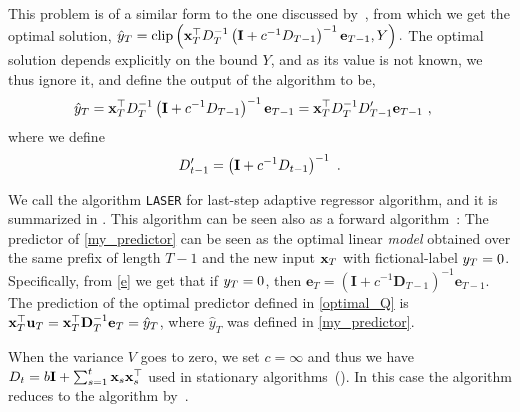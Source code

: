 This problem is of a similar form to the one discussed by~\cite{Forster}, from which we get the optimal solution,
\(
\hat{y}_{T} = {\rm clip}\left({
  {\mathbf{x}}^{\top}_{T}D_{T}^{-1}\left(\mathbf{I}+c^{-1}D_{T-1}\right)^{-1}\mathbf{e}_{T-1},Y}\right).
\)
The optimal solution depends explicitly on the bound $Y$, and as its
value is not known, we thus ignore it, and define the output of
the algorithm to be,
\begin{align}
\hat{y}_{T} &=
{\mathbf{x}}^{\top}_{T}D_{T}^{-1}\left(\mathbf{I}+c^{-1}D_{T-1}\right)^{-1}\mathbf{e}_{T-1}={\mathbf{x}}^{\top}_{T}D_{T}^{-1}D'_{T-1}\mathbf{e}_{T-1}
~, \label{my_predictor}
\end{align}
where we define
\begin{equation}
D'_{t-1}=\left(\mathbf{I}+c^{-1}D_{t-1}\right)^{-1}~.
\label{D_prime}
\end{equation}

We call the algorithm \texttt{LASER} for last-step adaptive regressor
algorithm, and it is summarized in .  This algorithm can be
seen also as a forward algorithm~\citep{AzouryWa01}: The predictor of
\eqref{my_predictor} can be seen as the optimal linear {\em model}
obtained over the same prefix of length $T-1$ and the new
input $\mathbf{x}_{T}$ with fictional-label $y_{T}=0$. Specifically, from \eqref{e}
we get that if $y_{T}=0$, then $\mathbf{e}_{T} = \left(\mathbf{I}+c^{-1}\mathbf{D}_{T-1}\right)^{-1}\mathbf{e}_{T-1}$.
The prediction of the optimal predictor defined in \eqref{optimal_Q} is
${\mathbf{x}}^{\top}_{T}\mathbf{u}_{T}={\mathbf{x}}^{\top}_{T}\mathbf{D}_{T}^{-1}\mathbf{e}_{T}=\hat{y}_T$,
where $\hat{y}_T$
was defined in \eqref{my_predictor}.

When the variance $V$ goes to zero, we set
$c=\infty$ and thus we have $D_{t}=b\mathbf{I}+\sum_{s=1}^t
\mathbf{x}_{s}{\mathbf{x}}^{\top}_{s}$ used in stationary
algorithms~(\citep{Vovk01,Forster,Hayes,CesaBianchiCoGe05}). In this case
the algorithm reduces to the algorithm by~\cite{Forster}.




